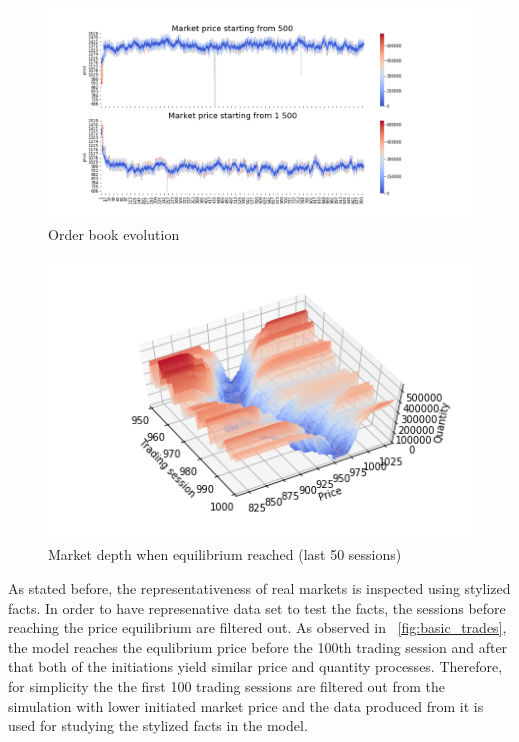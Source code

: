 \begin{figure}
    \includegraphics[width=\linewidth]{plots/basic_order_book_evo.png}
    \caption{Order book evolution}
    \label{fig:basic_orderbook_evo}
\end{figure}


\begin{figure}
    \includegraphics[width=\linewidth]{plots/basic_market_depth_in_equilibrium.png}
    \caption{Market depth when equilibrium reached (last 50 sessions)}
    \label{fig:basic_market_depth_equilibrium}
\end{figure}

As stated before, the representativeness of real markets is inspected using
stylized facts. In order to have represenative data set to test the facts, the
sessions before reaching the price equilibrium are filtered out. 
As observed in ~\ref{fig:basic_trades}, the model reaches the equlibrium 
price before the 100th trading session and after that both of the initiations 
yield similar price and quantity processes. Therefore, for simplicity the
the first 100 trading sessions are filtered out from the simulation with
lower initiated market price and the data produced from it is used for 
studying the stylized facts in the model.

